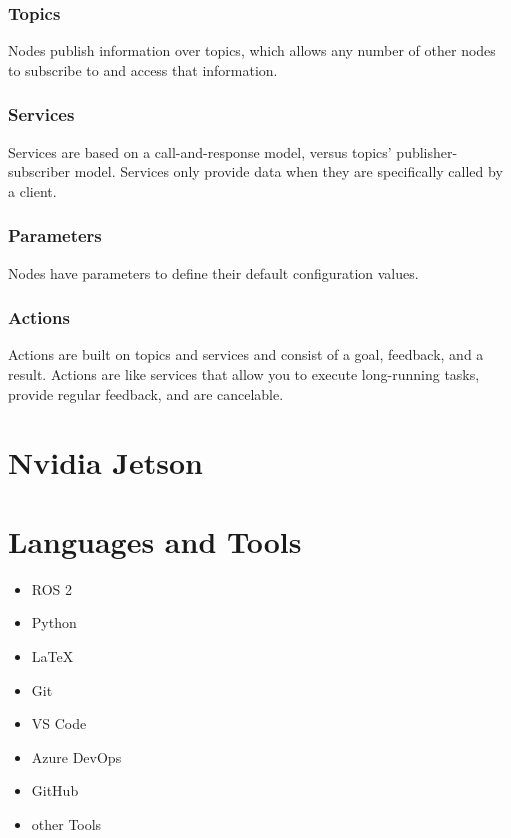 \subsubsection{Topics}
 Nodes publish information over topics, which allows any number of other nodes to subscribe to and access that information. %

\subsubsection{Services}
Services are based on a call-and-response model, versus topics’ publisher-subscriber model. Services only provide data when they are specifically called by a client. %

\subsubsection{Parameters}
Nodes have parameters to define their default configuration values. %

\subsubsection{Actions}
Actions are built on topics and services and consist of a goal, feedback, and a result. Actions are like services that allow you to execute long-running tasks, provide regular feedback, and are cancelable. %

\section{Nvidia Jetson}
\lipsum[1]

\section{Languages and Tools}

\begin{itemize}
    \item ROS 2
    \item Python
    \item LaTeX
    \item Git
    \item VS Code
    \item Azure DevOps
    \item GitHub
    \item other Tools
\end{itemize}